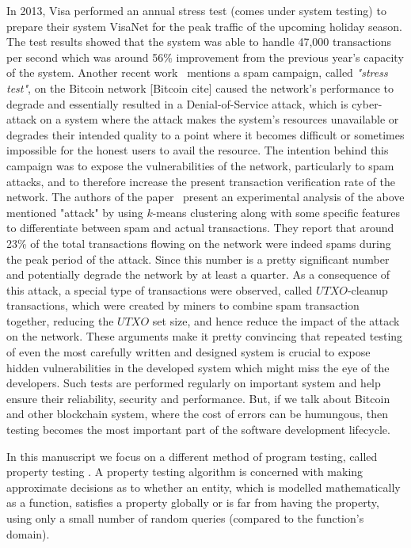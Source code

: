 In 2013, Visa performed an annual stress test (comes under system testing) to prepare their system VisaNet for the peak traffic of the upcoming holiday season. The test results showed that the system was able to handle 47,000 transactions per second which was around 56\% improvement from the previous year's capacity of the system. %
Another recent work~\cite{baqer2016stressing} mentions a spam campaign, called \textit{"stress test"}, on the Bitcoin network [Bitcoin cite] caused the network's performance to degrade and essentially resulted in a Denial-of-Service attack, which is cyber-attack on a system where the attack makes the system's resources unavailable or degrades their intended quality to a point where it becomes difficult or sometimes impossible for the honest users to avail the resource. The intention behind this campaign was to expose the vulnerabilities of the network, particularly to spam attacks, and to therefore increase the present transaction verification rate of the network. The authors of the paper~\cite{baqer2016stressing} present an experimental analysis of the above mentioned "attack" by using $k$-means clustering along with some specific features to differentiate between spam and actual transactions. They report that around 23\% of the total transactions flowing on the network were indeed spams during the peak period of the attack. Since this number is a pretty significant number and potentially degrade the network by at least a quarter. As a consequence of this attack, a special type of transactions were observed, called $UTXO$-cleanup transactions, which were created by miners to combine spam transaction together, reducing the $UTXO$ set size, and hence reduce the impact of the attack on the network. These arguments make it pretty convincing that repeated testing of even the most carefully written and designed system is crucial to expose hidden vulnerabilities in the developed system which might miss the eye of the developers. Such tests are performed regularly on important system and help ensure their reliability, security and performance. But, if we talk about Bitcoin and other blockchain system, where the cost of errors can be humungous, then testing becomes the most important part of the software development lifecycle.

In this manuscript we focus on a different method of program testing, called property testing \cite{ron2001property}. A property testing algorithm is concerned with making approximate decisions as to whether an entity, which is modelled mathematically as a function, satisfies a property globally or is far from having the property, using only a small number of random queries (compared to the function's domain).
\nocite{holzmann1995improvement}
\nocite{zaki2008formal}

